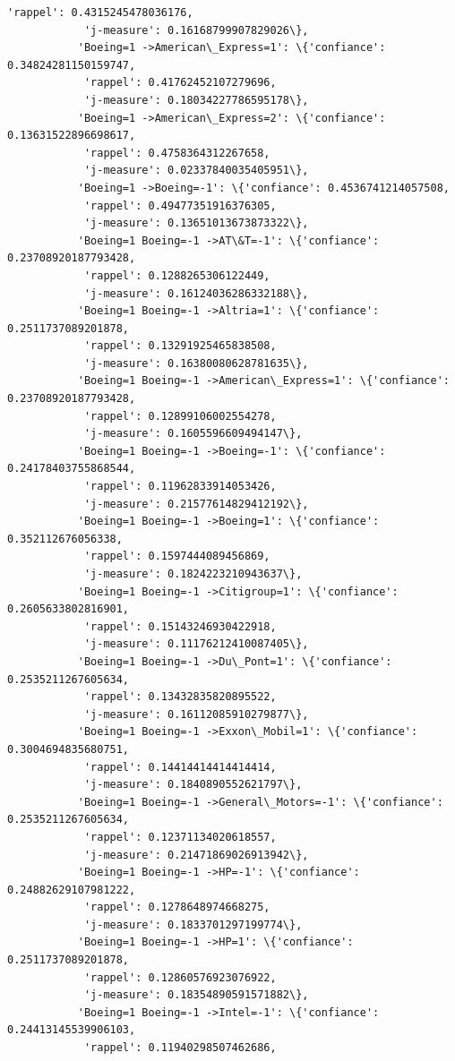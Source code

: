 \documentclass[11pt]{article}
\begin{document}
\begin{Verbatim}[commandchars=\\\{\}]
            'rappel': 0.4315245478036176,
            'j-measure': 0.16168799907829026\},
           'Boeing=1 ->American\_Express=1': \{'confiance': 0.34824281150159747,
            'rappel': 0.41762452107279696,
            'j-measure': 0.18034227786595178\},
           'Boeing=1 ->American\_Express=2': \{'confiance': 0.13631522896698617,
            'rappel': 0.4758364312267658,
            'j-measure': 0.02337840035405951\},
           'Boeing=1 ->Boeing=-1': \{'confiance': 0.4536741214057508,
            'rappel': 0.49477351916376305,
            'j-measure': 0.13651013673873322\},
           'Boeing=1 Boeing=-1 ->AT\&T=-1': \{'confiance': 0.23708920187793428,
            'rappel': 0.1288265306122449,
            'j-measure': 0.16124036286332188\},
           'Boeing=1 Boeing=-1 ->Altria=1': \{'confiance': 0.2511737089201878,
            'rappel': 0.13291925465838508,
            'j-measure': 0.16380080628781635\},
           'Boeing=1 Boeing=-1 ->American\_Express=1': \{'confiance': 0.23708920187793428,
            'rappel': 0.12899106002554278,
            'j-measure': 0.1605596609494147\},
           'Boeing=1 Boeing=-1 ->Boeing=-1': \{'confiance': 0.24178403755868544,
            'rappel': 0.11962833914053426,
            'j-measure': 0.21577614829412192\},
           'Boeing=1 Boeing=-1 ->Boeing=1': \{'confiance': 0.352112676056338,
            'rappel': 0.1597444089456869,
            'j-measure': 0.1824223210943637\},
           'Boeing=1 Boeing=-1 ->Citigroup=1': \{'confiance': 0.2605633802816901,
            'rappel': 0.15143246930422918,
            'j-measure': 0.11176212410087405\},
           'Boeing=1 Boeing=-1 ->Du\_Pont=1': \{'confiance': 0.2535211267605634,
            'rappel': 0.13432835820895522,
            'j-measure': 0.16112085910279877\},
           'Boeing=1 Boeing=-1 ->Exxon\_Mobil=1': \{'confiance': 0.3004694835680751,
            'rappel': 0.14414414414414414,
            'j-measure': 0.1840890552621797\},
           'Boeing=1 Boeing=-1 ->General\_Motors=-1': \{'confiance': 0.2535211267605634,
            'rappel': 0.12371134020618557,
            'j-measure': 0.21471869026913942\},
           'Boeing=1 Boeing=-1 ->HP=-1': \{'confiance': 0.24882629107981222,
            'rappel': 0.1278648974668275,
            'j-measure': 0.1833701297199774\},
           'Boeing=1 Boeing=-1 ->HP=1': \{'confiance': 0.2511737089201878,
            'rappel': 0.12860576923076922,
            'j-measure': 0.18354890591571882\},
           'Boeing=1 Boeing=-1 ->Intel=-1': \{'confiance': 0.24413145539906103,
            'rappel': 0.11940298507462686,

\end{Verbatim}
\end{document}
